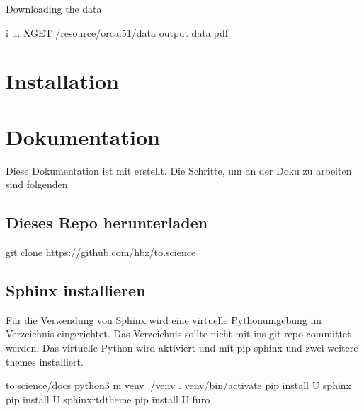 \documentclass[letterpaper,10pt,english]{sphinxmanual}
\begin{document}
\sphinxAtStartPar
Downloading the data

\begin{sphinxVerbatim}[commandchars=\\\{\}]
 \PYGZhy{}i \PYGZhy{}u: \PYGZhy{}XGET /resource/orca:51/data  \PYGZhy{}\PYGZhy{}output data.pdf 
\end{sphinxVerbatim}


\chapter{Installation}
\label{\detokenize{installation:installation}}\label{\detokenize{installation:id1}}\label{\detokenize{installation::doc}}

\chapter{Dokumentation}
\label{\detokenize{colophon:dokumentation}}\label{\detokenize{colophon:id1}}\label{\detokenize{colophon::doc}}
\sphinxAtStartPar
Diese Dokumentation ist mit  erstellt.
Die Schritte, um an der Doku zu arbeiten sind folgenden


\section{Dieses Repo herunterladen}
\label{\detokenize{colophon:dieses-repo-herunterladen}}\label{\detokenize{colophon:id2}}
\begin{sphinxVerbatim}[commandchars=\\\{\}]
\PYGZdl{} git clone https://github.com/hbz/to.science
\end{sphinxVerbatim}


\section{Sphinx installieren}
\label{\detokenize{colophon:sphinx-installieren}}\label{\detokenize{colophon:id3}}
\sphinxAtStartPar
Für die Verwendung von Sphinx wird eine virtuelle Pythonumgebung im Verzeichnis  eingerichtet. Das Verzeichnis sollte nicht mit
ins git repo committet werden. Das virtuelle Python wird aktiviert und mit pip sphinx und zwei weitere themes installiert.

\begin{sphinxVerbatim}[commandchars=\\\{\}]
\PYGZdl{}  to.science/docs
\PYGZdl{} python3 \PYGZhy{}m venv ./venv
\PYGZdl{} . venv/bin/activate
\PYGZdl{} pip install \PYGZhy{}U sphinx
\PYGZdl{} pip install \PYGZhy{}U sphinx\PYGZus{}rtd\PYGZus{}theme
\PYGZdl{} pip install \PYGZhy{}U furo
\end{sphinxVerbatim}
\end{document}
